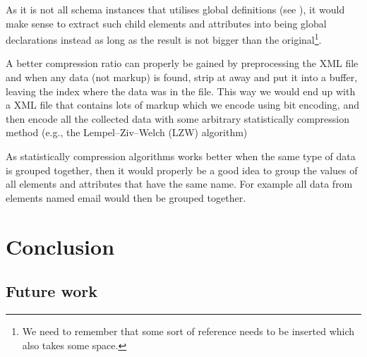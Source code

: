 \documentclass[a4paper, oneside]{memoir}
\theoremstyle{definition}
\begin{document}
\begin{description}
\item[Refactoring] As it is not all schema instances that utilises global
  definitions (see \label{sec:local-global-schema-definitions}), it would make
  sense to extract such child elements and attributes into being global
  declarations instead as long as the result is not bigger than the
  original\footnote{We need to remember that some sort of reference needs to be inserted
    which also takes some space.}.


\item A better compression ratio can properly be gained by preprocessing the XML
  file and when any data (not markup) is found, strip at away and put it into a
  buffer, leaving the index where the data was in the file. This way we would
  end up with a XML file that contains lots of markup which we encode using bit
  encoding, and then encode all the collected data with some arbitrary
  statistically compression method (e.g., the Lempel–Ziv–Welch (LZW) algorithm)

  As statistically compression algorithms works better when the same type of
  data is grouped together, then it would properly be a good idea to group the
  values of all elements and attributes that have the same name. For example all
  data from elements named email would then be grouped together.

\end{description}

\chapter{Conclusion}
\label{sec:conclusion}

\section{Future work}


\clearpage



\end{document}
